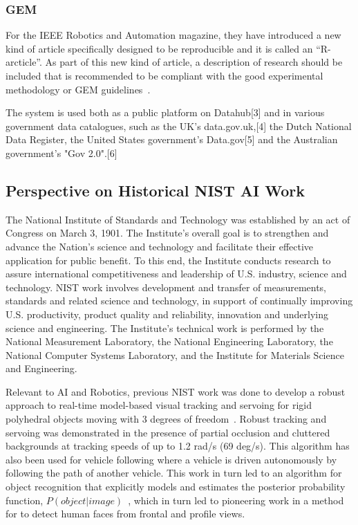 \subsubsection{GEM}
 For the IEEE Robotics and Automation magazine, they have introduced  a new kind of article specifically designed to be reproducible and it is called an ``R-arcticle''. As part of this new kind of article, a description of research should be included that is recommended to be compliant with the good experimental methodology or GEM guidelines~\cite{bonsignorio2017new}. 
 
 
 

The system is used both as a public platform on Datahub[3] and in various government data catalogues, such as the UK's data.gov.uk,[4] the Dutch National Data Register, the United States government's Data.gov[5] and the Australian government's "Gov 2.0".[6]



\subsection{Perspective on Historical NIST AI Work}
The National Institute of Standards and Technology was established by an act of Congress on March 3, 1901. The Institute's overall goal is to strengthen and advance the Nation's science and technology and facilitate their effective application for public benefit. To this end, the Institute conducts research to assure international competitiveness and leadership of U.S. industry, science and technology. NIST work involves development and transfer of measurements, standards and related science and technology, in support of continually improving U.S. productivity, product quality and reliability, innovation and underlying science and engineering. The Institute's technical work is performed by the National Measurement Laboratory, the National Engineering Laboratory, the National Computer Systems Laboratory, and the Institute for Materials Science and Engineering.

Relevant to AI and Robotics, previous NIST work was done to develop a robust approach to real-time model-based visual tracking and servoing for rigid polyhedral objects moving with 3 degrees of freedom~\cite{schneiderman1994real}. Robust tracking and servoing was demonstrated in the presence of partial occlusion and cluttered backgrounds at tracking speeds of up to 1.2 rad/s (69 deg/s). This algorithm has also been used for vehicle following where a vehicle is driven autonomously by following the path of another vehicle. This work in turn led to an algorithm for object recognition that explicitly models and estimates the posterior probability function, $P(object|image)$~\cite{schneiderman1998probabilistic}, which in turn led to pioneering work in  a method for to detect human faces from frontal and profile views.

